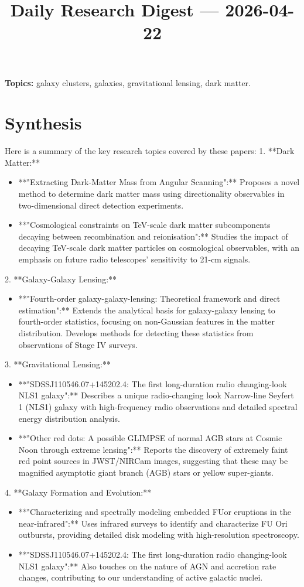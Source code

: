 \documentclass[11pt]{article}
\begin{document}
\title{Daily Research Digest --- 2026-04-22}
\author{}
\date{}
\maketitle
\textbf{Topics:} galaxy clusters, galaxies, gravitational lensing, dark matter.
\section*{Synthesis}
Here is a summary of the key research topics covered by these papers:
1. **Dark Matter:**
\begin{itemize}
\item **"Extracting Dark-Matter Mass from Angular Scanning":** Proposes a novel method to determine dark matter mass using directionality observables in two-dimensional direct detection experiments.
\item **"Cosmological constraints on TeV-scale dark matter subcomponents decaying between recombination and reionisation":** Studies the impact of decaying TeV-scale dark matter particles on cosmological observables, with an emphasis on future radio telescopes' sensitivity to 21-cm signals.
\end{itemize}
2. **Galaxy-Galaxy Lensing:**
\begin{itemize}
\item **"Fourth-order galaxy-galaxy-lensing: Theoretical framework and direct estimation":** Extends the analytical basis for galaxy-galaxy lensing to fourth-order statistics, focusing on non-Gaussian features in the matter distribution. Develops methods for detecting these statistics from observations of Stage IV surveys.
\end{itemize}
3. **Gravitational Lensing:**
\begin{itemize}
\item **"SDSSJ110546.07+145202.4: The first long-duration radio changing-look NLS1 galaxy":** Describes a unique radio-changing look Narrow-line Seyfert 1 (NLS1) galaxy with high-frequency radio observations and detailed spectral energy distribution analysis.
\item **"Other red dots: A possible GLIMPSE of normal AGB stars at Cosmic Noon through extreme lensing":** Reports the discovery of extremely faint red point sources in JWST/NIRCam images, suggesting that these may be magnified asymptotic giant branch (AGB) stars or yellow super-giants.
\end{itemize}
4. **Galaxy Formation and Evolution:**
\begin{itemize}
\item **"Characterizing and spectrally modeling embedded FUor eruptions in the near-infrared":** Uses infrared surveys to identify and characterize FU Ori outbursts, providing detailed disk modeling with high-resolution spectroscopy.
\item **"SDSSJ110546.07+145202.4: The first long-duration radio changing-look NLS1 galaxy":** Also touches on the nature of AGN and accretion rate changes, contributing to our understanding of active galactic nuclei.
\end{itemize}
\end{document}
